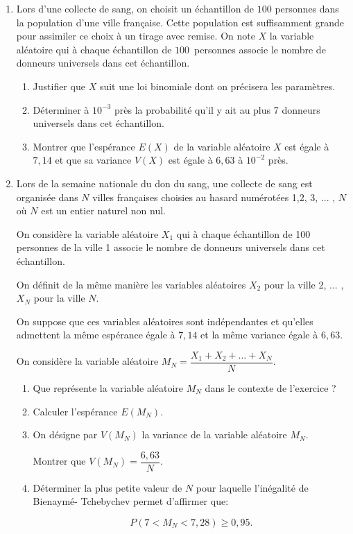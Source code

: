 \documentclass[10pt]{article}
\begin{document}
\begin{enumerate}[resume]
\item Lors d'une collecte de sang, on choisit un échantillon de $100$ personnes dans la population d'une ville française. Cette population est suffisamment grande pour assimiler ce choix à un tirage avec remise.
On note $X$ la variable aléatoire qui à chaque échantillon de $100$~personnes
associe le nombre de donneurs universels dans cet échantillon.

	\begin{enumerate}
		\item Justifier que $X$ suit une loi binomiale dont on précisera les paramètres.
		\item Déterminer à $10^{-3}$ près la probabilité qu'il y ait au plus 7 donneurs universels
dans cet échantillon.
		\item Montrer que l'espérance $E(X)$ de la variable aléatoire $X$ est égale à $7,14$ et
que sa variance $V(X)$ est égale à $6,63$ à $10^{-2}$ près.
	\end{enumerate}
\item Lors de la semaine nationale du don du sang, une collecte de sang est organisée dans $N$ villes françaises choisies au hasard numérotées 1,2, 3, ... , $N$ où $N$ est un entier naturel non nul.

On considère la variable aléatoire $X_1$ qui à chaque échantillon de 100 personnes de la ville 1 associe le nombre de donneurs universels dans cet échantillon.

On définit de la même manière les variables aléatoires $X_2$ pour la ville 2, ... , $X_N$ pour la ville $N$.

On suppose que ces variables aléatoires sont indépendantes et qu'elles admettent la même espérance égale à $7,14$ et la même variance égale à $6,63$.

On considère la variable aléatoire $M_N = \dfrac{X_1 + X_2 + \ldots + X_N}{N}$.
	\begin{enumerate}
		\item Que représente la variable aléatoire $M_N$ dans le contexte de l'exercice ?
		\item Calculer l'espérance $E(M_N)$.
		\item On désigne par $V(M_N)$ la variance de la variable aléatoire $M_N$.

Montrer que $V(M_N) = \dfrac{6,63}{N}$.
		\item Déterminer la plus petite valeur de $N$ pour laquelle l'inégalité de Bienaymé- Tchebychev permet d'affirmer que:

\[P(7 < M_N < 7,28) \geqslant 0,95.\]

	\end{enumerate}
\end{enumerate}

\bigskip
\end{document}

